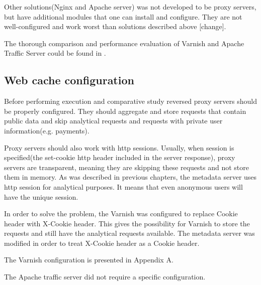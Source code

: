 Other solutions(Nginx and Apache server) was not developed to be proxy servers, but have additional modules that one can install and configure. They are not well-configured and work worst than solutions described above \cite{GuApacheTrafficUri}[change].

The thorough comparison and performance evaluation of Varnish and Apache Traffic Server could be found in \cite{VarnApacheReverse}.    


\subsection{Web cache configuration}

Before performing execution and comparative study reversed proxy servers should be properly configured. They should aggregate and store requests that contain public data and skip analytical requests and requests with private user information(e.g. payments).

Proxy servers should also work with http sessions. Usually, when session is specified(the set-cookie http header included in the server response), proxy servers are transparent, meaning they are skipping these requests and not store them in memory. As was described in previous chapters, the metadata server uses http session for analytical purposes. It means that even anonymous users will have the unique session. 

In order to solve the problem, the Varnish was configured to replace Cookie header with X-Cookie header. This gives the possibility for Varnish to store the requests and still have the analytical requests available. The metadata server was modified in order to treat X-Cookie header as a Cookie header.   

The Varnish configuration is presented in Appendix A.

The Apache traffic server did not require a specific configuration. 


\newpage